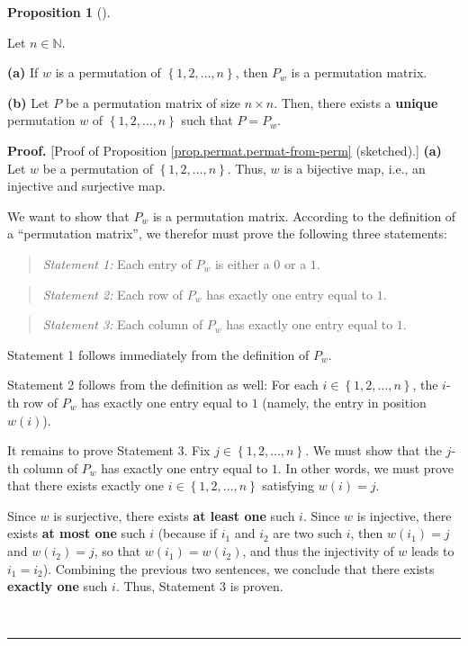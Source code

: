 \documentclass[numbers=enddot,12pt,final,onecolumn,notitlepage]{scrartcl}%
\theoremstyle{definition}
\newtheorem{prop}[theo]{Proposition}
\newenvironment{proposition}[1][]
{\begin{prop}[#1]\begin{leftbar}}
{\end{leftbar}\end{prop}}
\newenvironment{statement}{\begin{quote}}{\end{quote}}
\newenvironment{proof}[1][Proof]{\noindent\textbf{#1.} }{\ \rule{0.5em}{0.5em}}
\begin{document}
\begin{proposition}
\label{prop.permat.permat-from-perm}Let $n\in\mathbb{N}$.

\textbf{(a)} If $w$ is a permutation of $\left\{  1,2,\ldots,n\right\}  $,
then $P_{w}$ is a permutation matrix.

\textbf{(b)} Let $P$ be a permutation matrix of size $n\times n$. Then, there
exists a \textbf{unique} permutation $w$ of $\left\{  1,2,\ldots,n\right\}  $
such that $P=P_{w}$.
\end{proposition}

\begin{proof}
[Proof of Proposition \ref{prop.permat.permat-from-perm} (sketched).]%
\textbf{(a)} Let $w$ be a permutation of $\left\{  1,2,\ldots,n\right\}  $.
Thus, $w$ is a bijective map, i.e., an injective and surjective map.

We want to show that $P_{w}$ is a permutation matrix. According to the
definition of a \textquotedblleft permutation matrix\textquotedblright, we
therefor must prove the following three statements:

\begin{statement}
\textit{Statement 1:} Each entry of $P_{w}$ is either a $0$ or a $1$.
\end{statement}

\begin{statement}
\textit{Statement 2:} Each row of $P_{w}$ has exactly one entry equal to $1$.
\end{statement}

\begin{statement}
\textit{Statement 3:} Each column of $P_{w}$ has exactly one entry equal to
$1$.
\end{statement}

Statement 1 follows immediately from the definition of $P_{w}$.

Statement 2 follows from the definition as well: For each $i\in\left\{
1,2,\ldots,n\right\}  $, the $i$-th row of $P_{w}$ has exactly one entry equal
to $1$ (namely, the entry in position $w\left(  i\right)  $).

It remains to prove Statement 3. Fix $j\in\left\{  1,2,\ldots,n\right\}  $. We
must show that the $j$-th column of $P_{w}$ has exactly one entry equal to
$1$. In other words, we must prove that there exists exactly one $i\in\left\{
1,2,\ldots,n\right\}  $ satisfying $w\left(  i\right)  =j$.

Since $w$ is surjective, there exists \textbf{at least one} such $i$. Since
$w$ is injective, there exists \textbf{at most one} such $i$ (because if
$i_{1}$ and $i_{2}$ are two such $i$, then $w\left(  i_{1}\right)  =j$ and
$w\left(  i_{2}\right)  =j$, so that $w\left(  i_{1}\right)  =w\left(
i_{2}\right)  $, and thus the injectivity of $w$ leads to $i_{1}=i_{2}$).
Combining the previous two sentences, we conclude that there exists
\textbf{exactly one} such $i$. Thus, Statement 3 is proven.


\end{proof}
\end{document}
